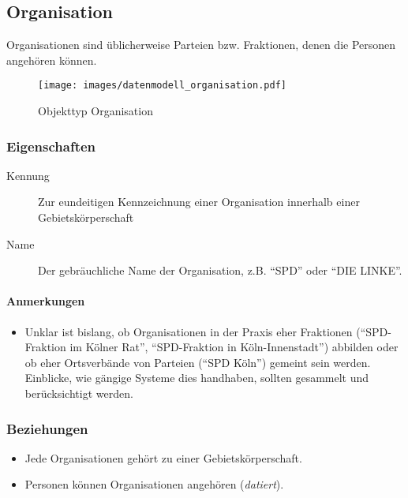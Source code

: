\documentclass[,a4paper]{article}
\makeatletter
\def\maxwidth{\ifdim\Gin@nat@width>\linewidth\linewidth
\else\Gin@nat@width\fi}
\let\Oldincludegraphics\includegraphics
\renewcommand{\includegraphics}[1]{\Oldincludegraphics[width=\maxwidth]{#1}}
\makeatother
\begin{document}
\subsection{Organisation}

Organisationen sind üblicherweise Parteien bzw. Fraktionen, denen die
Personen angehören können.

\begin{figure}[htbp]
\centering
\texttt{[image: images/datenmodell\_organisation.pdf]}
\caption{Objekttyp Organisation}
\end{figure}

\subsubsection{Eigenschaften}

\begin{description}
\item[Kennung]
Zur eundeitigen Kennzeichnung einer Organisation innerhalb einer
Gebietskörperschaft
\item[Name]
Der gebräuchliche Name der Organisation, z.B. ``SPD'' oder ``DIE
LINKE''.
\end{description}

\paragraph{Anmerkungen}

\begin{itemize}
\item
  Unklar ist bislang, ob Organisationen in der Praxis eher Fraktionen
  (``SPD-Fraktion im Kölner Rat'', ``SPD-Fraktion in Köln-Innenstadt'')
  abbilden oder ob eher Ortsverbände von Parteien (``SPD Köln'') gemeint
  sein werden. Einblicke, wie gängige Systeme dies handhaben, sollten
  gesammelt und berücksichtigt werden.
\end{itemize}

\subsubsection{Beziehungen}

\begin{itemize}
\item
  Jede Organisationen gehört zu einer Gebietskörperschaft.
\item
  Personen können Organisationen angehören (\emph{datiert}).
\end{itemize}
\end{document}
